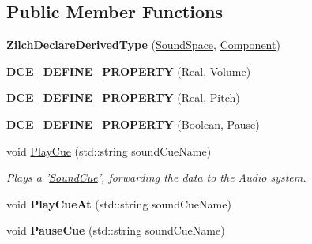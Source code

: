 \subsection*{Public Member Functions}
\begin{DoxyCompactItemize}
\item 
\hypertarget{classDCEngine_1_1Components_1_1SoundSpace_a34f079c35edb0a860cb4db425a327d43}{{\bfseries Zilch\-Declare\-Derived\-Type} (\hyperlink{classDCEngine_1_1Components_1_1SoundSpace}{Sound\-Space}, \hyperlink{classDCEngine_1_1Component}{Component})}\label{classDCEngine_1_1Components_1_1SoundSpace_a34f079c35edb0a860cb4db425a327d43}

\item 
\hypertarget{classDCEngine_1_1Components_1_1SoundSpace_a5ca46640e871450920768bb27aa06035}{{\bfseries D\-C\-E\-\_\-\-D\-E\-F\-I\-N\-E\-\_\-\-P\-R\-O\-P\-E\-R\-T\-Y} (Real, Volume)}\label{classDCEngine_1_1Components_1_1SoundSpace_a5ca46640e871450920768bb27aa06035}

\item 
\hypertarget{classDCEngine_1_1Components_1_1SoundSpace_affce68df6a2f746dab198932dd5333eb}{{\bfseries D\-C\-E\-\_\-\-D\-E\-F\-I\-N\-E\-\_\-\-P\-R\-O\-P\-E\-R\-T\-Y} (Real, Pitch)}\label{classDCEngine_1_1Components_1_1SoundSpace_affce68df6a2f746dab198932dd5333eb}

\item 
\hypertarget{classDCEngine_1_1Components_1_1SoundSpace_a8e63de34799f56ba06199ccb1f030f9c}{{\bfseries D\-C\-E\-\_\-\-D\-E\-F\-I\-N\-E\-\_\-\-P\-R\-O\-P\-E\-R\-T\-Y} (Boolean, Pause)}\label{classDCEngine_1_1Components_1_1SoundSpace_a8e63de34799f56ba06199ccb1f030f9c}

\item 
void \hyperlink{classDCEngine_1_1Components_1_1SoundSpace_ab5eb44c6fa62e6b90283679681ff6c9b}{Play\-Cue} (std\-::string sound\-Cue\-Name)
\begin{DoxyCompactList}\small\item\em Plays a '\hyperlink{classDCEngine_1_1SoundCue}{Sound\-Cue}', forwarding the data to the Audio system. \end{DoxyCompactList}\item 
\hypertarget{classDCEngine_1_1Components_1_1SoundSpace_a28ff304bff3d7105489cb5bad39847a2}{void {\bfseries Play\-Cue\-At} (std\-::string sound\-Cue\-Name)}\label{classDCEngine_1_1Components_1_1SoundSpace_a28ff304bff3d7105489cb5bad39847a2}

\item 
\hypertarget{classDCEngine_1_1Components_1_1SoundSpace_a5b0083c365c81acde4fd01d028b812d4}{void {\bfseries Pause\-Cue} (std\-::string sound\-Cue\-Name)}\label{classDCEngine_1_1Components_1_1SoundSpace_a5b0083c365c81acde4fd01d028b812d4}


\end{DoxyCompactItemize}
